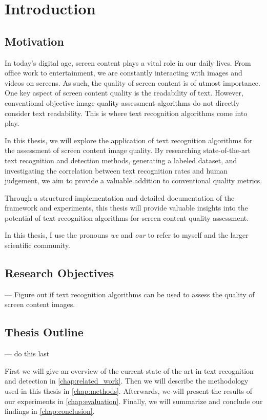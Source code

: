 \chapter{Introduction}
\label{chap:Introduction}

\section{Motivation}

In today’s digital age, screen content plays a vital role in our daily lives.
From office work to entertainment, we are constantly interacting with images and videos on screens.
As such, the quality of screen content is of utmost importance.
One key aspect of screen content quality is the readability of text.
However, conventional objective image quality assessment algorithms do not directly consider text readability.
This is where text recognition algorithms come into play.

In this thesis, we will explore the application of text recognition algorithms for the assessment of screen content image quality.
By researching state-of-the-art text recognition and detection methods, generating a labeled dataset, and investigating the correlation between text recognition rates and human judgement, we aim to provide a valuable addition to conventional quality metrics.

Through a structured implementation and detailed documentation of the framework and experiments, this thesis will provide valuable insights into the potential of text recognition algorithms for screen content quality assessment.

In this thesis, I use the pronouns \textit{we} and \textit{our} to refer to myself and the larger scientific community.

\section{Research Objectives}

--- Figure out if text recognition algorithms can be used to assess the quality of screen content images.

\section{Thesis Outline}

--- do this last

First we will give an overview of the current state of the art in text recognition and detection in \autoref{chap:related_work}.
Then we will describe the methodology used in this thesis in \autoref{chap:methods}.
Afterwards, we will present the results of our experiments in \autoref{chap:evaluation}.
Finally, we will summarize and conclude our findings in \autoref{chap:conclusion}.
